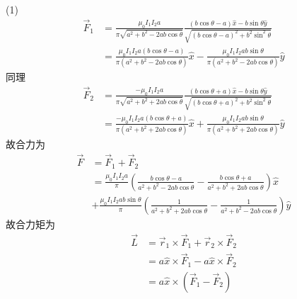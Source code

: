 \documentclass{phyasgn}
\begin{document}
\begin{sol}[2-32]
  \begin{figure}[h]
  \end{figure}
  (1)$$\begin{aligned}
    \vec{F}_1&=\frac{\mu_0I_1I_2a}{\pi\sqrt{a^2+b^2-2ab\cos\theta}}\frac{(b\cos\theta-a)\hat{x}-b\sin\theta\hat{y}}{\sqrt{(b\cos\theta-a)^2+b^2\sin^2\theta}}\\
    &=\frac{\mu_0I_1I_2a(b\cos\theta-a)}{\pi(a^2+b^2-2ab\cos\theta)}\hat{x}-\frac{\mu_0I_1I_2ab\sin\theta}{\pi (a^2+b^2-2ab\cos\theta)}\hat{y}
  \end{aligned}$$
  同理$$
  \begin{aligned}
    \vec{F}_2&=\frac{-\mu_0I_1I_2a}{\pi\sqrt{a^2+b^2+2ab\cos\theta}}\frac{(b\cos\theta+a)\hat{x}-b\sin\theta\hat{y}}{\sqrt{(b\cos\theta+a)^2+b^2\sin^2\theta}}\\
    &=\frac{-\mu_0I_1I_2a(b\cos\theta+a)}{\pi(a^2+b^2+2ab\cos\theta)}\hat{x}+\frac{\mu_0I_1I_2ab\sin\theta}{\pi (a^2+b^2+2ab\cos\theta)}\hat{y}
  \end{aligned}$$
  故合力为
  $$\begin{aligned}
    \vec{F}&=\vec{F}_1+\vec{F}_2\\
    &=\frac{\mu_0I_1I_2a}{\pi}\left (\frac{b\cos\theta-a}{a^2+b^2-2ab\cos\theta}-\frac{b\cos\theta+a}{a^2+b^2+2ab\cos\theta} \right )\hat{x}\\
    &+\frac{\mu_0I_1I_2ab\sin\theta}{\pi}\left (\frac{1}{a^2+b^2+2ab\cos\theta}-\frac{1}{a^2+b^2-2ab\cos\theta}\right )\hat{y}
  \end{aligned}$$
  故合力矩为
  $$\begin{aligned}
    \vec{L}&=\vec{r}_1\times\vec{F}_1+\vec{r}_2\times\vec{F}_2\\
    &=a\hat{x}\times\vec{F}_1-a\hat{x}\times\vec{F}_2\\
    &=a\hat{x}\times\left (\vec{F}_1-\vec{F}_2\right )\\

\end{aligned}$$
\end{sol}
\end{document}
